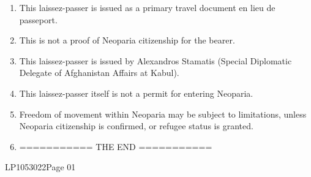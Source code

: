 \documentclass[a4paper,10pt]{article}
\newcommand{\makeboxbtmline}[0]{\vfill{\ttfamily\color{red}LP1053022}}
\begin{document}
\begin{minipage}[t][111mm][t]{174mm}
\begin{tcolorbox}[height=110mm,width=85mm,left=2mm,right=2mm,nobeforeafter,colframe=NavyBlue,colback=white,boxrule=0.5pt]
\begin{minipage}[t][100mm][t]{78.75mm}
                \begin{enumerate}[noitemsep,leftmargin=16pt]
                    \item This laissez-passer is issued as a primary travel document en lieu de passeport.
                    \item This is not a proof of Neoparia citizenship for the bearer.
                    \item This laissez-passer is issued by {Alexandros Stamatis}
                        (Special Diplomatic Delegate of Afghanistan Affairs at Kabul).
                    \item This laissez-passer itself is not a permit for entering Neoparia.
                    \item Freedom of movement within Neoparia may be subject to limitations,
                        unless Neoparia citizenship is confirmed,
                        or refugee status is granted.
                    \item =========== THE END ===========
                \end{enumerate}
            \end{minipage}

            \makeboxbtmline\ttfamily\hfill Page 01
        \end{tcolorbox}
    \end{minipage}

    \vspace{4mm}
\end{document}
